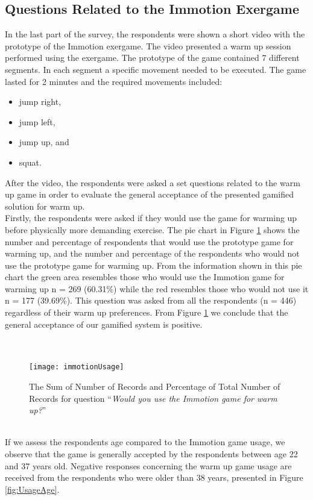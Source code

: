 \subsection{Questions Related to the Immotion Exergame}
In the last part of the survey, the respondents were shown a short video with the prototype of the Immotion exergame. The video presented a warm up session performed using the exergame. The prototype of the game contained 7 different segments. In each segment a specific movement needed to be executed. The game lasted for 2 minutes and the required movements included: 
\begin{itemize}
\item jump right,
\item jump left,
\item jump up, and
\item squat.
\end{itemize}
After the video, the respondents were asked a set questions related to the warm up game in order to evaluate the general acceptance of the presented gamified solution for warm up.\\ Firstly, the respondents were asked if they would use the game for warming up before physically more demanding exercise. The pie chart in Figure  \ref{fig:immotionUsage} shows the number and percentage of respondents that would use the prototype game for warming up, and the number and percentage of the respondents who would not use the prototype game for warming up. From the information shown in this pie chart the green area resembles those who would use the Immotion game for warming up n = 269 (60.31\%) while the red resembles those who would not use it n = 177 (39.69\%). This question was asked from all the respondents (n = 446) regardless of their warm up preferences. From Figure \ref{fig:immotionUsage} we conclude that the general acceptance of our gamified system is positive.\\\\\\
\begin{figure}[h]
    \centering
    \texttt{[image: immotionUsage]}
    \caption{The Sum of Number of Records and Percentage of Total Number of Records for question ``\textit{Would you use the Immotion game for warm up?}''}
    \label{fig:immotionUsage}
\end{figure}\\
 If we assess the respondents age compared to the Immotion game usage, we observe that the game is generally accepted by the respondents between age 22 and 37 years old. Negative responses concerning the warm up game usage are received from the respondents who were older than 38 years, presented in Figure \ref{fig:UsageAge}.\\

